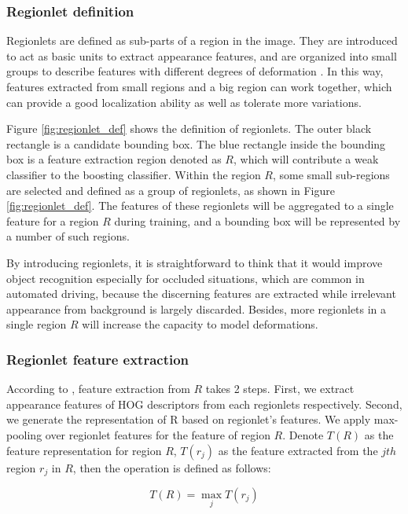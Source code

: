 \documentclass{article} %
\begin{document}
\subsubsection{Regionlet definition}

Regionlets are defined as sub-parts of a region in the image. They are introduced to act as basic units to extract appearance features, and are organized into small groups to describe features with different degrees of deformation \cite{Wang2013}. In this way, features extracted from small regions and a big region can work together, which can provide a good localization ability as well as tolerate more variations.

Figure \ref{fig:regionlet_def} shows the definition of regionlets. The outer black rectangle is a candidate bounding box. The blue rectangle inside the bounding box is a feature extraction region denoted as $R$, which will contribute a weak classifier to the boosting classifier. Within the region $R$, some small sub-regions are selected and defined as a group of regionlets, as shown in Figure \ref{fig:regionlet_def}. The features of these regionlets will be aggregated to a single feature for a region $R$ during training, and a bounding box will be represented by a number of such regions.

By introducing regionlets, it is straightforward to think that it would improve object recognition especially for occluded situations, which are common in automated driving, because the discerning features are extracted while irrelevant appearance from background is largely discarded. Besides, more regionlets in a single region $R$ will increase the capacity to model deformations.


\subsubsection{Regionlet feature extraction}

According to \cite{Wang2013}, feature extraction from $R$ takes 2 steps. First, we extract appearance features of HOG descriptors \cite{dalal2005histograms} from each regionlets respectively. Second, we generate the representation of R based on regionlet’s features. We apply max-pooling over regionlet features for the feature of region $R$. Denote $T(R)$ as the feature representation for region $R$, $T(r_j)$ as the feature extracted from the $jth$ region $r_j$ in $R$, then the operation is defined as follows:

\begin{equation*}
T(R) = \max \limits_j T(r_j)
\end{equation*}
\end{document}
